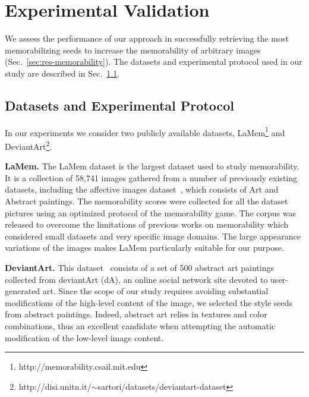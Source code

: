 \documentclass{sig-alternate-05-2015}
\begin{document}
\section{Experimental Validation}
\label{sec:exp}
\begin{sloppypar}
We assess the performance of our approach in successfully retrieving the most memorabilizing seeds to increase the memorability of arbitrary images (Sec.~\ref{sec:res-memorability}).
The datasets and experimental protocol used in our study are described in Sec.~\ref{sec:dataset}.

\subsection{Datasets and Experimental Protocol}
\label{sec:dataset}
In our experiments we consider two publicly available datasets, LaMem\footnote{http://memorability.csail.mit.edu} and DeviantArt\footnote{http://disi.unitn.it/$\sim$sartori/datasets/deviantart-dataset}.

\textbf{LaMem.} The LaMem dataset \cite{khosla2015understanding} is the largest dataset used to study memorability. It is a collection of 58,741 images gathered from a number of previously existing datasets, including the affective images dataset~\cite{machajdik2010affective}, which consists of Art and Abstract paintings. The memorability scores were collected for all the dataset pictures using an optimized protocol of the memorability game. The corpus was released to overcome the limitations of previous works on memorability which considered small datasets and very specific image domains. The large appearance variations of the images makes LaMem particularly suitable for our purpose.  

\textbf{DeviantArt.} This dataset~\cite{sartori2015affective} consists of a set of 500 abstract art paintings collected from deviantArt (dA), an online social network site devoted to user-generated art. Since the scope of our study requires avoiding substantial modifications of the high-level content of the image, we selected the style seeds from abstract paintings. Indeed, abstract art relies in textures and color combinations, thus an excellent candidate when attempting the automatic modification of the low-level image content.


\end{sloppypar}
\end{document}
